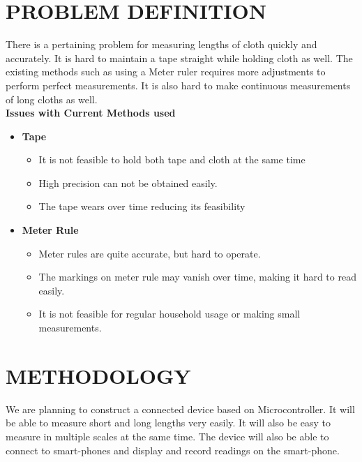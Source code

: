 \documentclass[12pt,a4paper]{article}
\begin{document}
\setcounter{page}{1}

\section{\uppercase {Problem Definition}}

There is a pertaining problem for measuring lengths of cloth quickly and accurately. It is hard to maintain a tape straight while holding cloth as well. The existing methods such as using a Meter ruler requires more adjustments to perform perfect measurements. It is also hard to make continuous measurements of long cloths as well. \\[1cm]

{\fontsize{16pt}{24}\selectfont \textbf {Issues with Current Methods used} }\\

\begin{itemize}
  \item \textbf{Tape}
  \begin{itemize}
  	\item It is not feasible to hold both tape and cloth at the same time
	\item High precision can not be obtained easily.
	\item The tape wears over time reducing its feasibility
  \end{itemize}
  \item \textbf{Meter Rule}
  \begin{itemize}
  	\item Meter rules are quite accurate, but hard to operate.
	\item The markings on meter rule may vanish over time, making it hard to read easily. 
	\item It is not feasible for regular household usage or making small measurements.
  \end{itemize}
\end{itemize}


 \newpage
\section{\uppercase {Methodology}}

We are planning to construct a connected device based on Microcontroller. It will be able to measure short and long lengths very easily. It will also be easy to measure in multiple scales at the same time. The device will also be able to connect to smart-phones and display and record readings on the smart-phone. 
\end{document}

